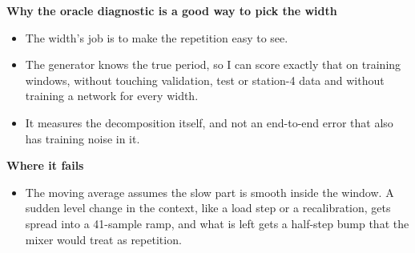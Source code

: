 \documentclass[10pt]{article}
\begin{document}
\textbf{Why the oracle diagnostic is a good way to pick the width}
\begin{itemize}
\item The width's job is to make the repetition easy to see.
\item The generator knows the true period, so I can score exactly that on training windows, without touching validation, test or station-4 data and without training a network for every width.
\item It measures the decomposition itself, and not an end-to-end error that also has training noise in it.
\end{itemize}
\textbf{Where it fails}
\begin{itemize}
\item The moving average assumes the slow part is smooth inside the window. A sudden level change in the context, like a load step or a recalibration, gets spread into a 41-sample ramp, and what is left gets a half-step bump that the mixer would treat as repetition.
\end{itemize}
\end{document}
